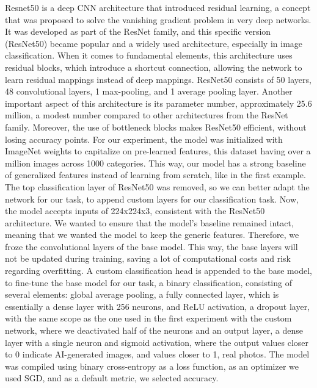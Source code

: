 \documentclass[runningheads]{llncs}
\begin{document}
Resnet50 is a deep CNN architecture that introduced residual learning, a concept that was proposed to solve the vanishing gradient problem in very deep networks. It was developed as part of the ResNet family, and this specific version (ResNet50) became popular and a widely used architecture, especially in image classification. When it comes to fundamental elements, this architecture uses residual blocks, which introduce a shortcut connection, allowing the network to learn residual mappings instead of deep mappings. ResNet50 consists of 50 layers, 48 convolutional layers, 1 max-pooling, and 1 average pooling layer. Another important aspect of this architecture is its parameter number, approximately 25.6 million, a modest number compared to other architectures from the ResNet family. Moreover, the use of bottleneck blocks makes ResNet50 efficient, without losing accuracy points. For our experiment, the model was initialized with ImageNet weights to capitalize on pre-learned features, this dataset having over a million images across 1000 categories. This way, our model has a strong baseline of generalized features instead of learning from scratch, like in the first example. The top classification layer of ResNet50 was removed, so we can better adapt the network for our task, to append custom layers for our classification task. Now, the model accepts inputs of 224x224x3, consistent with the ResNet50 architecture. We wanted to ensure that the model's baseline remained intact, meaning that we wanted the model to keep the generic features. Therefore, we froze the convolutional layers of the base model. This way, the base layers will not be updated during training, saving a lot of computational costs and risk regarding overfitting. A custom classification head is appended to the base model, to fine-tune the base model for our task, a binary classification, consisting of several elements: global average pooling, a fully connected layer, which is essentially a dense layer with 256 neurons, and ReLU activation, a dropout layer, with the same scope as the one used in the first experiment with the custom network, where we deactivated half of the neurons and an output layer, a dense layer with a single neuron and sigmoid activation, where the output values closer to 0 indicate AI-generated images, and values closer to 1, real photos. The model was compiled using binary cross-entropy as a loss function, as an optimizer we used SGD, and as a default metric, we selected accuracy. 
\end{document}
